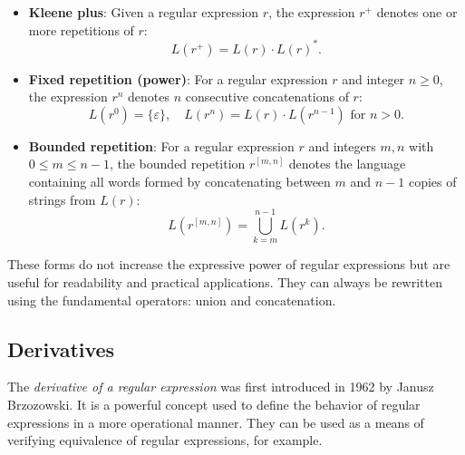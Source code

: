 \begin{itemize}
    \item \textbf{Kleene plus}: Given a regular expression $r$, the expression $r^+$ denotes one or more repetitions of $r$:
    \[
    L(r^+) = L(r) \cdot L(r)^*.
    \]

    \item \textbf{Fixed repetition (power)}: For a regular expression $r$ and integer $n \geq 0$, the expression $r^n$ denotes $n$ consecutive concatenations of $r$:
    \[
    L(r^0) = \{ \varepsilon \}, \quad L(r^n) = L(r) \cdot L(r^{n-1}) \text{ for } n > 0.
    \]

	 \item \textbf{Bounded repetition}: For a regular expression $r$ and integers $m, n$ with $0 \leq m \leq n-1$, the bounded repetition $r^{[m,n]}$ denotes the language containing all words formed by concatenating between $m$ and $n-1$ copies of strings from $L(r)$:
    \[
    L(r^{[m,n]}) = \bigcup_{k=m}^{n-1} L(r^k).
    \]
\end{itemize}

These forms do not increase the expressive power of regular expressions but are useful for readability and practical applications. They can always be rewritten using the fundamental operators: union and concatenation.

\subsection{Derivatives}
\label{chap:prelim:derivatives}
The \emph{derivative of a regular expression} was first introduced in 1962 by Janusz Brzozowski. It is a powerful concept used to define the behavior of regular expressions in a more operational manner. They can be used as a means of verifying equivalence of regular expressions, for example.

